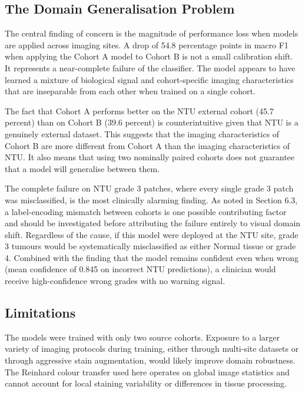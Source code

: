 \documentclass[12pt, a4paper]{article}
\begin{document}
\subsection{The Domain Generalisation Problem}

The central finding of concern is the magnitude of performance loss when models
are applied across imaging sites. A drop of 54.8 percentage points in macro F1
when applying the Cohort A model to Cohort B is not a small calibration shift.
It represents a near-complete failure of the classifier. The model appears to
have learned a mixture of biological signal and cohort-specific imaging
characteristics that are inseparable from each other when trained on a single cohort.

The fact that Cohort A performs better on the NTU external cohort (45.7 percent)
than on Cohort B (39.6 percent) is counterintuitive given that NTU is a genuinely
external dataset. This suggests that the imaging characteristics of Cohort B are
more different from Cohort A than the imaging characteristics of NTU. It also
means that using two nominally paired cohorts does not guarantee that a model will
generalise between them.

The complete failure on NTU grade 3 patches, where every single grade 3 patch was
misclassified, is the most clinically alarming finding. As noted in Section 6.3,
a label-encoding mismatch between cohorts is one possible contributing factor and
should be investigated before attributing the failure entirely to visual domain
shift. Regardless of the cause, if this model were deployed at the NTU site, grade
3 tumours would be systematically misclassified as either Normal tissue or grade 4.
Combined with the finding that the model remains confident even when wrong (mean
confidence of 0.845 on incorrect NTU predictions), a clinician would receive
high-confidence wrong grades with no warning signal.

\subsection{Limitations}

The models were trained with only two source cohorts. Exposure to a larger variety
of imaging protocols during training, either through multi-site datasets or through
aggressive stain augmentation, would likely improve domain robustness. The Reinhard
colour transfer used here operates on global image statistics and cannot account for
local staining variability or differences in tissue processing.
\end{document}
